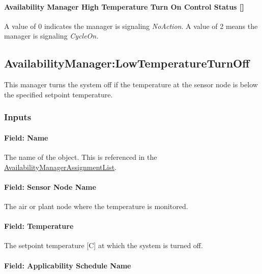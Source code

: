 \paragraph{Availability Manager High Temperature Turn On Control Status {[]}}\label{availability-manager-high-temperature-turn-on-control-status}

A value of 0 indicates the manager is signaling \emph{NoAction}. A value of 2 means the manager is signaling \emph{CycleOn.}

\subsection{AvailabilityManager:LowTemperatureTurnOff}\label{availabilitymanagerlowtemperatureturnoff}

This manager turns the system off if the temperature at the sensor node is below the specified setpoint temperature.

\subsubsection{Inputs}\label{inputs-7-027}

\paragraph{Field: Name}\label{field-name-6-023}

The name of the object. This is referenced in the \hyperref[availabilitymanagerassignmentlist]{AvailabilityManagerAssignmentList}.

\paragraph{Field: Sensor Node Name}\label{field-sensor-node-name-2}

The air or plant node where the temperature is monitored.

\paragraph{Field: Temperature}\label{field-temperature-2}

The setpoint temperature {[}C{]} at which the system is turned off.

\paragraph{Field: Applicability Schedule Name}\label{field-applicability-schedule-name}

